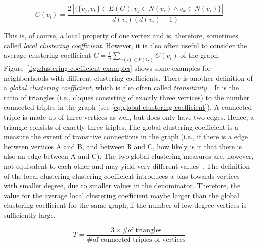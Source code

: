 \begin{equation}
 C(v_i) = \frac{2 \, |\{\{v_j, v_k\} \in E(G) : v_j \in N(v_i) \wedge v_k \in N(v_i)\}| }{d(v_i)(d(v_i) - 1)}
 \label{eq:clustering-coefficient}
\end{equation}

This is, of course, a local property of one vertex and is, therefore, sometimes called \emph{local clustering coefficient}.
However, it is also often useful to consider the average clustering coefficient \(\bar{C} = \frac{1}{n} \sum_{v(i) \in V(G)} C(v_i)\) of the graph.
Figure~\ref{fig:clustering-coefficient-examples} shows some examples for neighborhoods with different clustering coefficients.
There is another definition of a \emph{global clustering coefficient}, which is also often called \emph{transitivity}~\cite{Boccaletti2006}.
It is the ratio of triangles (i.e., cliques consisting of exactly three vertices) to the number connected triples in the graph (see \autoref{eq:global-clustering-coefficient}).
A connected triple is made up of three vertices as well, but does only have two edges.
Hence, a triangle consists of exactly three triples.
The global clustering coefficient is a measure the extent of transitive connections in the graph (i.e., if there is a edge between vertices A and B, and between B and C, how likely is it that there is also an edge between A and C).
The two global clustering measures are, however, not equivalent to each other and may yield very different values~\cite{Newman2010}.
The definition of the local clustering clustering coefficient introduces a bias towards vertices with smaller degree, due to smaller values in the denominator.
Therefore, the value for the average local clustering coefficient maybe larger than the global clustering coefficient for the same graph, if the number of low-degree vertices is sufficiently large.

\begin{equation}
 T = \frac{3 \times \text{\# of triangles}}{\text{\# of connected triples of vertices}}
 \label{eq:global-clustering-coefficient}
\end{equation}

